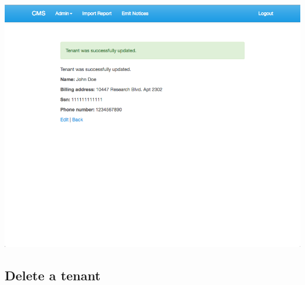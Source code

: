 \begin{itemize}
    \includegraphics[scale=0.25]{./images/ss/tenant/edit/5.png}
\end{itemize}

\subsection*{Delete a tenant}

